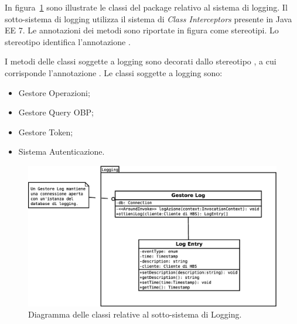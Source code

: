 In figura~\ref{fig:classi-principali:log} sono illustrate le classi del package relativo al sistema di logging.
Il sotto-sistema di logging utilizza il sistema di \emph{Class Interceptors} presente in Java EE 7.
Le annotazioni dei metodi sono riportate in figura come stereotipi.
Lo stereotipo  identifica l'annotazione .

I metodi delle classi soggette a logging sono decorati dallo stereotipo , a cui corrisponde l'annotazione .
Le classi soggette a logging sono:
\begin{itemize}
	\item Gestore Operazioni;
	\item Gestore Query OBP;
	\item Gestore Token;
	\item Sistema Autenticazione.
\end{itemize}

\begin{figure}[h]
    \centering
    \includegraphics[width=\textwidth]{Images/dia/Logging.eps}
    \caption{Diagramma delle classi relative al sotto-sistema di Logging.}
    \label{fig:classi-principali:log}
\end{figure}

